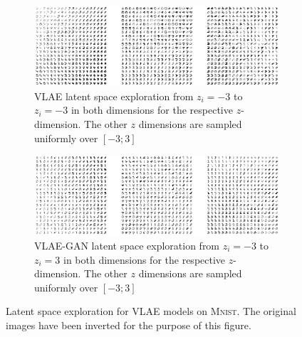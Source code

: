 \begin{figure}
    \centering
    \begin{subfigure}{\textwidth}
        \centering
        \includegraphics[width=\textwidth]{images/latent_space_traversals/vlae_mnist.png}
        \caption{VLAE latent space exploration from $z_i=-3$ to $z_i=-3$ in both dimensions for the respective $z$-dimension. The other $z$ dimensions are sampled uniformly over $[-3; 3]$}
        \label{subfig:vlae_mnist_latent_space_traversal}
    \end{subfigure}
    \begin{subfigure}{\textwidth}
        \centering
        \includegraphics[width=\textwidth]{images/latent_space_traversals/vlae_gan_mnist.png}
        \caption{VLAE-GAN latent space exploration from $z_i=-3$ to $z_i=3$ in both dimensions for the respective $z$-dimension. The other $z$ dimensions are sampled uniformly over $[-3; 3]$}
        \label{subfig:vlae_gan_mnist_latent_space_traversal}
    \end{subfigure}
    \caption[VLAE Models on \textsc{Mnist} - Latent Space Exploration]{Latent space exploration for VLAE models on \textsc{Mnist}. The original images have been inverted for the purpose of this figure.}
    \label{fig:mnist_latent_space_traversal_vlae}
\end{figure}

